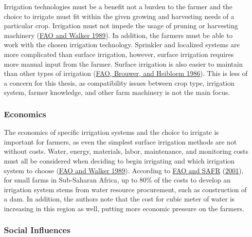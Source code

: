 \documentclass[12pt,twoside]{reedthesis}
\begin{document}
Irrigation technologies must be a benefit not a burden to the farmer and the choice to irrigate must fit within the given growing and harvesting needs of a particular crop. Irrigation must not impede the usage of pruning or harvesting machinery (\protect\hyperlink{ref-faoGuidelinesDesigningEvaluating1989}{FAO and Walker 1989}). In addition, the farmers must be able to work with the chosen irrigation technology. Sprinkler and localized systems are more complicated than surface irrigation, however, surface irrigation requires more manual input from the farmer. Surface irrigation is also easier to maintain than other types of irrigation (\protect\hyperlink{ref-faoIrrigationWaterManagement1986a}{FAO, Brouwer, and Heibloem 1986}). This is less of a concern for this thesis, as compatibility issues between crop type, irrigation system, farmer knowledge, and other farm machinery is not the main focus.

\hypertarget{econ}{%
\subsubsection{Economics}\label{econ}}

The economics of specific irrigation systems and the choice to irrigate is important for farmers, as even the simplest surface irrigation methods are not without costs. Water, energy, materials, labor, maintenance, and monitoring costs must all be considered when deciding to begin irrigating and which irrigation system to choose (\protect\hyperlink{ref-faoGuidelinesDesigningEvaluating1989}{FAO and Walker 1989}). According to \protect\hyperlink{ref-faoIrrigationManualPlanning2001}{FAO and SAFR} (\protect\hyperlink{ref-faoIrrigationManualPlanning2001}{2001}), for small farms in Sub-Saharan Africa, up to 80\% of the costs to develop an irrigation system stems from water resource procurement, such as construction of a dam. In addition, the authors note that the cost for cubic meter of water is increasing in this region as well, putting more economic pressure on the farmers.

\hypertarget{socinf}{%
\subsubsection{Social Influences}\label{socinf}}
\end{document}
